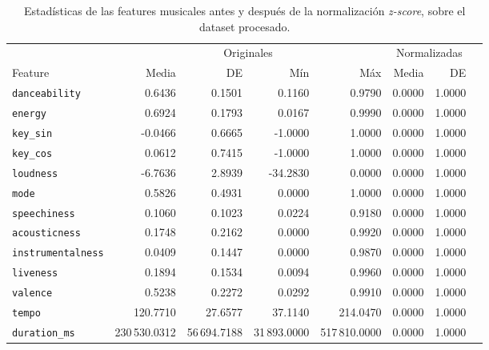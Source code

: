 \begin{table}[htbp]
\centering
\caption{Estadísticas de las features musicales antes y después de la normalización \textit{z-score}, sobre el dataset procesado.}
\label{tab:normalization_stats}
\small
\begin{tabular}{lrrrrrrr}
\toprule
 & \multicolumn{4}{c}{Originales} & \multicolumn{2}{c}{Normalizadas} \\
\cmidrule(lr){2-5} \cmidrule(lr){6-7}
Feature & Media & DE & Mín & Máx & Media & DE \\
\midrule
\texttt{danceability} & 0.6436 & 0.1501 & 0.1160 & 0.9790 & 0.0000 & 1.0000 \\
\texttt{energy} & 0.6924 & 0.1793 & 0.0167 & 0.9990 & 0.0000 & 1.0000 \\
\texttt{key\_sin} & -0.0466 & 0.6665 & -1.0000 & 1.0000 & 0.0000 & 1.0000 \\
\texttt{key\_cos} & 0.0612 & 0.7415 & -1.0000 & 1.0000 & 0.0000 & 1.0000 \\
\texttt{loudness} & -6.7636 & 2.8939 & -34.2830 & 0.0000 & 0.0000 & 1.0000 \\
\texttt{mode} & 0.5826 & 0.4931 & 0.0000 & 1.0000 & 0.0000 & 1.0000 \\
\texttt{speechiness} & 0.1060 & 0.1023 & 0.0224 & 0.9180 & 0.0000 & 1.0000 \\
\texttt{acousticness} & 0.1748 & 0.2162 & 0.0000 & 0.9920 & 0.0000 & 1.0000 \\
\texttt{instrumentalness} & 0.0409 & 0.1447 & 0.0000 & 0.9870 & 0.0000 & 1.0000 \\
\texttt{liveness} & 0.1894 & 0.1534 & 0.0094 & 0.9960 & 0.0000 & 1.0000 \\
\texttt{valence} & 0.5238 & 0.2272 & 0.0292 & 0.9910 & 0.0000 & 1.0000 \\
\texttt{tempo} & 120.7710 & 27.6577 & 37.1140 & 214.0470 & 0.0000 & 1.0000 \\
\texttt{duration\_ms} & 230\,530.0312 & 56\,694.7188 & 31\,893.0000 & 517\,810.0000 & 0.0000 & 1.0000 \\
\bottomrule
\end{tabular}
\end{table}
